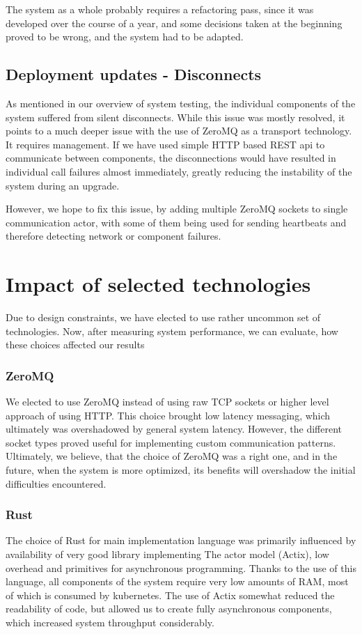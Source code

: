 The system as a whole probably requires a refactoring pass, since it was developed over the course of a year,
and some decisions taken at the beginning proved to be wrong, and the system had to be adapted.

\subsection{Deployment updates - Disconnects}
As mentioned in our overview of system testing, the individual components of the system suffered from silent disconnects.
While this issue was mostly resolved, it points  to a much deeper issue with the use of ZeroMQ as a transport technology.
It requires management. If we have used simple HTTP based REST api to communicate between components, the disconnections
would have resulted in individual call failures almost immediately, greatly reducing the instability of the system during
an upgrade.

However, we hope to fix this issue, by adding multiple ZeroMQ sockets to single communication actor, with some
of them being used for sending heartbeats and therefore detecting network or component failures.

\section{Impact of selected technologies}
Due to design constraints, we have elected to use rather uncommon set of technologies. Now, after measuring system
performance, we can evaluate, how these choices affected our results

\subsubsection{ZeroMQ}
We elected to use ZeroMQ instead of using raw TCP sockets or higher level approach of using HTTP.
This choice brought low latency messaging, which ultimately was overshadowed by general system latency. However, the
different socket types proved useful for implementing custom communication patterns. Ultimately, we
believe, that the choice of ZeroMQ was a right one, and in the future, when the system is more optimized, its benefits
will overshadow the initial difficulties encountered.

\subsubsection{Rust}
The choice of Rust for main implementation language was primarily influenced by availability of very good library
implementing The actor model (Actix), low overhead and primitives for asynchronous programming. Thanks to the
use of this language, all components of the system require very low amounts of RAM, most of which
is consumed by kubernetes. The use of Actix somewhat reduced the readability of code, but allowed us to create
fully asynchronous components, which increased system throughput considerably.

